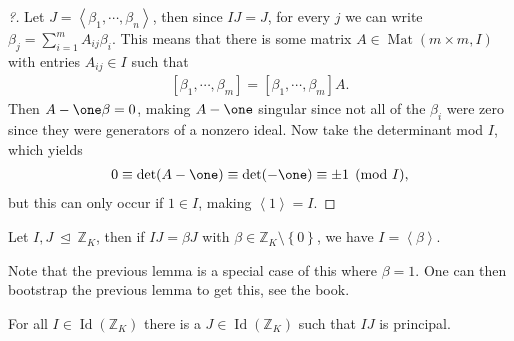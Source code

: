 \begin{proof}[?]

Let \(J = \left\langle{ \beta_1, \cdots, \beta_n }\right\rangle\), then
since \(IJ = J\), for every \(j\) we can write
\(\beta_j = \sum_{i=1}^m A_{ij} \beta_i\). This means that there is some
matrix \(A\in \operatorname{Mat}(m\times m, I)\) with entries
\(A_{ij} \in I\) such that
\begin{align*}
{\left[ {\beta_1, \cdots, \beta_m} \right]}
=
{\left[ {\beta_1, \cdots, \beta_m} \right]}A
.\end{align*}
Then \(A-\one \mathbf{\beta} = 0\), making \(A-\one\) singular since not
all of the \(\beta_i\) were zero since they were generators of a nonzero
ideal. Now take the determinant mod \(I\), which yields
\begin{align*}
0 \equiv \det(A-\one) \equiv \det(-\one) \equiv \pm 1\pmod I
,\end{align*}
but this can only occur if \(1\in I\), making
\(\left\langle{ 1 }\right\rangle= I\).

\end{proof}

\begin{lemma}[?]

Let \(I, J{~\trianglelefteq~}{\mathbb{Z}}_K\), then if \(IJ = \beta J\)
with \(\beta \in {\mathbb{Z}}_K \setminus\left\{{0}\right\}\), we have
\(I = \left\langle{ \beta }\right\rangle\).

\end{lemma}

\begin{remark}

Note that the previous lemma is a special case of this where
\(\beta = 1\). One can then bootstrap the previous lemma to get this,
see the book.

\end{remark}

\begin{lemma}

For all \(I\in \operatorname{Id}({\mathbb{Z}}_K)\) there is a
\(J \in \operatorname{Id}({\mathbb{Z}}_K)\) such that \(IJ\) is
principal.

\end{lemma}

